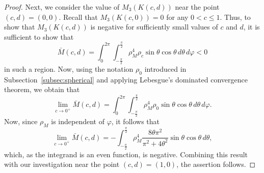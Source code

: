 \documentclass[10pt,a4paper]{amsart}
\begin{document}
\begin{proof}
Next, we consider the value of $M_3(K(c,d))$ near the point $(c,d)=(0,0)$. Recall that $M_3(K(c,0))=0$ for any $0 < c \leq 1$. Thus, to show that $M_3(K(c,d))$ is negative for sufficiently small values of $c$ and $d$, it is sufficient to show that
\[
\bar{M}(c,d)= \int_{0}^{2\pi}\int_{-\frac{\pi}{2}}^{\frac{\pi}{2}}  \rho_M^4 \rho_c \sin \theta \cos \theta \,d\theta\,d\varphi < 0
\]
in such a region. Now, using the notation $\rho_0$ introduced in Subsection~\ref{subsec:spherical} and applying Lebesgue's dominated convergence theorem, we obtain that
\[
\lim_{c \to 0^+} \bar{M}(c,d) = \int_{0}^{2\pi}\int_{-\frac{\pi}{2}}^{\frac{\pi}{2}}  \rho_M^4 \rho_0 \sin \theta \cos \theta \,d\theta\,d\varphi .
\]
Now, since $\rho_M$ is independent of $\varphi$, it follows that
\[
\lim_{c \to 0^+} \bar{M}(c,d) = - \int_{-\frac{\pi}{2}}^{\frac{\pi}{2}} \rho_M^4 \frac{8 \theta \pi^2}{\pi^2+4 \theta^2} \sin \theta \cos \theta \,d\theta,
\]
which, as the integrand is an even function, is negative.
Combining this result with our investigation near the point $(c,d)=(1,0)$, the assertion follows.
\end{proof}
\end{document}
